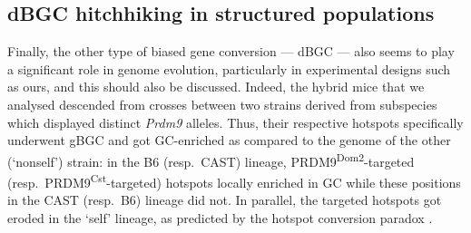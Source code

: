 \subsection{dBGC hitchhiking in structured populations}



Finally, the other type of biased gene conversion — dBGC — also seems to play a significant role in genome evolution, particularly in experimental designs such as ours, and this should also be discussed.
Indeed, the hybrid mice that we analysed descended from crosses between two strains derived from subspecies which displayed distinct \textit{Prdm9} alleles.
Thus, their respective hotspots specifically underwent gBGC and got GC-enriched as compared to the genome of the other (‘nonself’) strain:
in the B6 (resp.\ CAST) lineage, PRDM9\textsuperscript{Dom2}-targeted (resp.\ PRDM9\textsuperscript{Cst}-targeted) hotspots locally enriched in GC while these positions in the CAST (resp.\ B6) lineage did not.
In parallel, the targeted hotspots got eroded in the ‘self’ lineage, as predicted by the hotspot conversion paradox \citep{boulton1997hotspot}.


